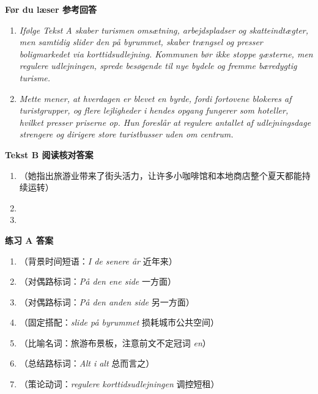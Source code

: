 \begin{answerbox}
\textbf{Før du læser 参考回答}
\begin{enumerate}
  \item \textit{Ifølge Tekst A skaber turismen omsætning, arbejdspladser og skatteindtægter, men samtidig slider den på byrummet, skaber trængsel og presser boligmarkedet via korttidsudlejning. Kommunen bør ikke stoppe gæsterne, men regulere udlejningen, sprede besøgende til nye bydele og fremme bæredygtig turisme.}
  \item \textit{Mette mener, at hverdagen er blevet en byrde, fordi fortovene blokeres af turistgrupper, og flere lejligheder i hendes opgang fungerer som hoteller, hvilket presser priserne op. Hun foreslår at regulere antallet af udlejningsdage strengere og dirigere store turistbusser uden om centrum.}
\end{enumerate}

\textbf{Tekst B 阅读核对答案}
\begin{enumerate}
  \item {}（她指出旅游业带来了街头活力，让许多小咖啡馆和本地商店整个夏天都能持续运转）
  \item {}
  \item {}
\end{enumerate}

\textbf{练习 A 答案}
\begin{enumerate}
  \item {}（背景时间短语：\textit{I de senere år} 近年来）
  \item {}（对偶路标词：\textit{På den ene side} 一方面）
  \item {}（对偶路标词：\textit{På den anden side} 另一方面）
  \item {}（固定搭配：\textit{slide på byrummet} 损耗城市公共空间）
  \item {}（比喻名词：旅游布景板，注意前文不定冠词 \textit{en}）
  \item {}（总结路标词：\textit{Alt i alt} 总而言之）
  \item {}（策论动词：\textit{regulere korttidsudlejningen} 调控短租）
\end{enumerate}


\end{answerbox}
